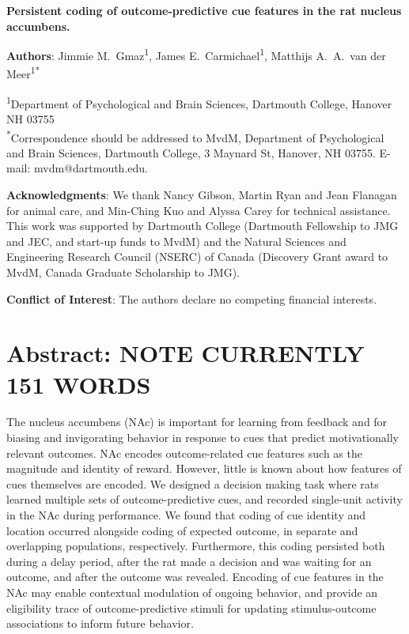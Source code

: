 \documentclass[11pt]{article}
\begin{document}
\renewcommand{\BBAB}{\BBAA}
\renewcommand{\APACrefYearMonthDay}[3]{\APACrefYear{#1}}

{\Large\bf Persistent coding of outcome-predictive cue features in the
  rat nucleus accumbens.}

{\bf Authors}: Jimmie M.\ Gmaz\textsuperscript{1}, James
E.\ Carmichael\textsuperscript{1}, Matthijs A.\ A.\ van der
Meer\textsuperscript{1*}

\textsuperscript{1}Department of Psychological and Brain Sciences,
Dartmouth College, Hanover NH
03755\\ 

\textsuperscript{*}Correspondence should be addressed to MvdM,
Department of Psychological and Brain Sciences, Dartmouth College, 3
Maynard St, Hanover, NH 03755. E-mail: {\sffamily mvdm@dartmouth.edu}.

\textbf{Acknowledgments}: We thank Nancy Gibson, Martin Ryan and Jean
Flanagan for animal care, and Min-Ching Kuo and
Alyssa Carey for technical assistance. This work was supported by
Dartmouth College (Dartmouth Fellowship to JMG and JEC, and start-up funds to
MvdM) and the Natural Sciences and Engineering Research Council
(NSERC) of Canada (Discovery Grant award to MvdM, Canada Graduate
Scholarship to JMG).

\textbf{Conflict of Interest}: The authors declare no competing
financial interests.\\

\newpage
\linenumbers

\section*{Abstract: NOTE CURRENTLY 151 WORDS}

The nucleus accumbens (NAc) is important for learning from feedback
and for biasing and invigorating behavior in response to cues that
predict motivationally relevant outcomes. NAc encodes outcome-related
cue features such as the magnitude and identity of reward. However,
little is known about how features of cues themselves are encoded.
We designed a decision making task where rats learned multiple sets of
outcome-predictive cues, and recorded single-unit activity in the NAc
during performance. We found that coding of cue identity and location
occurred alongside coding of expected outcome, in separate and overlapping populations, respectively. Furthermore, this
coding persisted both during a delay period, after the rat made a
decision and was waiting for an outcome, and after the outcome was
revealed. Encoding of cue features in the NAc may enable contextual
modulation of ongoing behavior, and provide an eligibility trace of
outcome-predictive stimuli for updating stimulus-outcome associations
to inform future behavior.
\end{document}
